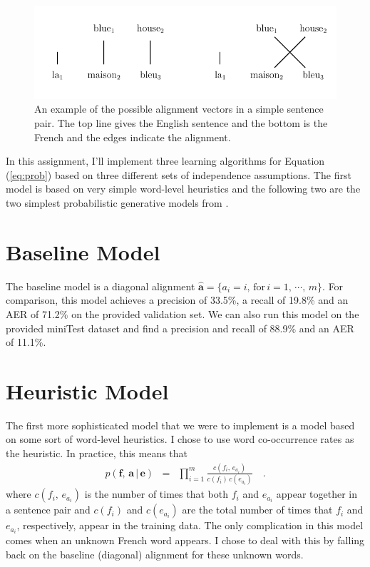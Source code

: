 \documentclass[11pt]{article}
\newcommand{\eq}[1]{Equation (\ref{eq:#1})}
\newcommand{\figlabel}[1]{\label{fig:#1}}
\newcommand{\bvec}[1]{\ensuremath{\boldsymbol{#1}}}
\newcommand{\code}[1]{{\sffamily #1}}
\begin{document}
\begin{figure}[htbp]
\begin{center}
    \includegraphics{fig1.pdf}
\end{center}
\caption{%
An example of the possible alignment vectors in a simple sentence pair.
The top line gives the English sentence and the bottom is the French and the
edges indicate the alignment.
\figlabel{blue-house}}
\end{figure}

In this assignment, I'll implement three learning algorithms for \eq{prob}
based on three different sets of independence assumptions.
The first model is based on very simple word-level heuristics and the
following two are the two simplest probabilistic generative models from
\citet{ibm}.

\section{Baseline Model}

The baseline model is a diagonal alignment $\hat{\bvec{a}} = \{a_i =
i,\,\mathrm{for}\,i=1,\,\cdots,\,m\}$.
For comparison, this model achieves a precision of 33.5\%, a recall of 19.8\%
and an AER of 71.2\% on the provided validation set.
We can also run this model on the provided \code{miniTest} dataset and find a
precision and recall of 88.9\% and an AER of 11.1\%.

\section{Heuristic Model}

The first more sophisticated model that we were to implement is a model based
on some sort of word-level heuristics.
I chose to use word co-occurrence rates as the heuristic.
In practice, this means that
\begin{eqnarray}
p(\bvec{f},\,\bvec{a}\,|\,\bvec{e}) &=&
    \prod_{i=1}^m \frac{c(f_i,\,e_{a_i})}{c(f_i)\,c(e_{a_i})} \quad.
\end{eqnarray}
where $c(f_i,\,e_{a_i})$ is the number of times that both $f_i$ and $e_{a_i}$
appear together in a sentence pair and $c(f_i)$ and $c(e_{a_i})$ are the
total number of times that $f_i$ and $e_{a_i}$, respectively, appear in the
training data.
The only complication in this model comes when an unknown French word appears.
I chose to deal with this by falling back on the baseline (diagonal) alignment
for these unknown words.
\end{document}
